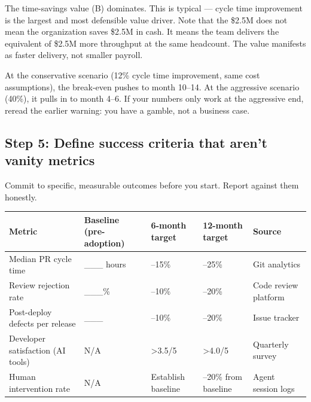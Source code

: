 \documentclass[
  a4paper,
  DIV=11,
  numbers=noendperiod]{scrreprt}
\newcounter{none} %
\begin{document}
The time-savings value (B) dominates. This is typical --- cycle time
improvement is the largest and most defensible value driver. Note that
the \$2.5M does not mean the organization saves \$2.5M in cash. It means
the team delivers the equivalent of \$2.5M more throughput at the same
headcount. The value manifests as faster delivery, not smaller payroll.

At the conservative scenario (12\% cycle time improvement, same cost
assumptions), the break-even pushes to month 10--14. At the aggressive
scenario (40\%), it pulls in to month 4--6. If your numbers only work at
the aggressive end, reread the earlier warning: you have a gamble, not a
business case.

\subsection{Step 5: Define success criteria that aren't vanity
metrics}\label{step-5-define-success-criteria-that-arent-vanity-metrics}

Commit to specific, measurable outcomes before you start. Report against
them honestly.

{\def\LTcaptype{none} %
\begin{longtable}[]{@{}
  >{\raggedright\arraybackslash}p{}
  >{\raggedright\arraybackslash}p{}
  >{\raggedright\arraybackslash}p{}
  >{\raggedright\arraybackslash}p{}
  >{\raggedright\arraybackslash}p{}@{}}
\toprule\noalign{}
\begin{minipage}[b]{\linewidth}\raggedright
Metric
\end{minipage} & \begin{minipage}[b]{\linewidth}\raggedright
Baseline (pre-adoption)
\end{minipage} & \begin{minipage}[b]{\linewidth}\raggedright
6-month target
\end{minipage} & \begin{minipage}[b]{\linewidth}\raggedright
12-month target
\end{minipage} & \begin{minipage}[b]{\linewidth}\raggedright
Source
\end{minipage} \\
\midrule\noalign{}
\endhead
\bottomrule\noalign{}
\endlastfoot
Median PR cycle time & \_\_\_ hours & --15\% & --25\% & Git analytics \\
Review rejection rate & \_\_\_\% & --10\% & --20\% & Code review
platform \\
Post-deploy defects per release & \_\_\_ & --10\% & --20\% & Issue
tracker \\
Developer satisfaction (AI tools) & N/A & \textgreater3.5/5 &
\textgreater4.0/5 & Quarterly survey \\
Human intervention rate & N/A & Establish baseline & --20\% from
baseline & Agent session logs \\
\end{longtable}
}
\end{document}
